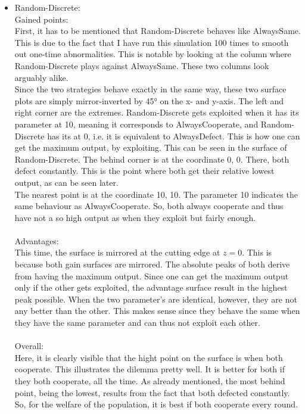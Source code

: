 \documentclass{article}
\begin{document}
\begin{itemize}

	\item Random-Discrete:\\

		Gained points:\\
			First, it has to be mentioned that Random-Discrete behaves like AlwaysSame.
			This is due to the fact that I have run this simulation 100 times to smooth out one-time abnormalities.
			This is notable by looking at the column where Random-Discrete plays against AlwaysSame.
			These two columns look arguably alike.\\
			Since the two strategies behave exactly in the same way, these two surface plots are simply mirror-inverted by 45° on the x- and y-axis.
			The left and right corner are the extremes.
			Random-Discrete gets exploited when it has its parameter at 10, meaning it corresponds to AlwaysCooperate, and Random-Discrete has its at 0, i.e. it is equivalent to AlwaysDefect.
			This is how one can get the maximum output, by exploiting.
			This can be seen in the surface of Random-Discrete.
			The behind corner is at the coordinate 0, 0.
			There, both defect constantly.
			This is the point where both get their relative lowest output, as can be seen later.\\
			The nearest point is at the coordinate 10, 10.
			The parameter 10 indicates the same behaviour as AlwaysCooperate.
			So, both always cooperate and thus have not a so high output as when they exploit but fairly enough.\\
		\\Advantages:\\
			This time, the surface is mirrored at the cutting edge at $z=0$.
			This is because both gain surfaces are mirrored.
			The absolute peaks of both derive from having the maximum output.
			Since one can get the maximum output only if the other gets exploited, the advantage surface result in the highest peak possible.
			When the two parameter's are identical, however, they are not any better than the other.
			This makes sense since they behave the same when they have the same parameter and can thus not exploit each other.\\
		\\Overall:\\
			Here, it is clearly visible that the hight point on the surface is when both cooperate.
			This illustrates the dilemma pretty well.
			It is better for both if they both cooperate, all the time.
			As already mentioned, the most behind point, being the lowest, results from the fact that both defected constantly.
			So, for the welfare of the population, it is best if both cooperate every round.


\end{itemize}
\end{document}
